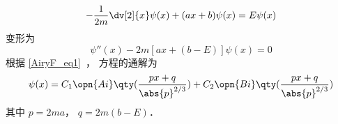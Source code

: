 

\begin{equation}
-\frac{1}{2m}\dv[2]{x}\psi(x) + (ax + b)\psi(x) = E\psi(x)
\end{equation}
变形为
\begin{equation}
\psi''(x) - 2m[ax + (b-E)]\psi(x) = 0
\end{equation}
根据 \autoref{AiryF_eq1}~， 方程的通解为
\begin{equation}
\psi(x) = C_1\opn{Ai}\qty(\frac{px+q}{\abs{p}^{2/3}}) + C_2 \opn{Bi}\qty(\frac{px+q}{\abs{p}^{2/3}})
\end{equation}
其中 $p = 2ma$， $q = 2m(b - E)$．
